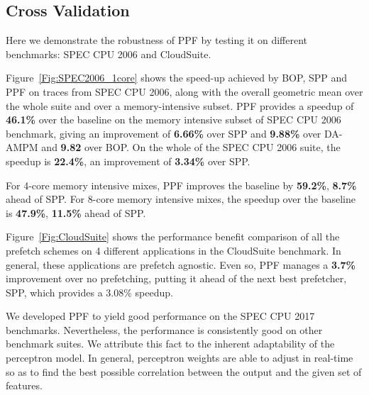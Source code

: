 \subsection{Cross Validation}
\label{Results-CrossVal}


Here we demonstrate the robustness of PPF by testing it on different
benchmarks: SPEC CPU 2006 and CloudSuite.


Figure~\ref{Fig:SPEC2006_1core} shows the speed-up achieved by BOP, SPP and
PPF on traces from SPEC CPU 2006, along with the overall geometric mean over
the whole suite and over a memory-intensive subset.  PPF provides a speedup of
\textbf{46.1\%} over the baseline on the memory intensive subset of SPEC CPU
2006 benchmark, giving an improvement of \textbf{6.66\%} over SPP and
\textbf{9.88\%} over DA-AMPM and \textbf{9.82} over BOP.  On the whole of 
the SPEC CPU 2006 suite, the speedup is \textbf{22.4\%}, an improvement 
of \textbf{3.34\%} over SPP.

For 4-core memory intensive mixes, PPF improves the baseline by
\textbf{59.2\%}, \textbf{8.7\%} ahead of SPP. For 8-core memory intensive
mixes, the speedup over the baseline is \textbf{47.9\%}, \textbf{11.5\%} ahead
of SPP.

Figure~\ref{Fig:CloudSuite} shows the performance benefit comparison of all
the prefetch schemes on 4 different applications in the CloudSuite benchmark.
In general, these applications are prefetch agnostic. Even so, PPF manages a
\textbf{3.7\%} improvement over no prefetching, putting it ahead of the next
best prefetcher, SPP, which provides a 3.08\% speedup.

We developed PPF to yield good performance on the SPEC CPU 2017 benchmarks.
Nevertheless, the performance is consistently good on other benchmark suites.
We attribute this fact to the inherent adaptability of the perceptron model.
In general, perceptron weights are able to adjust in real-time so as to find
the best possible correlation between the output and the given set of
features.
